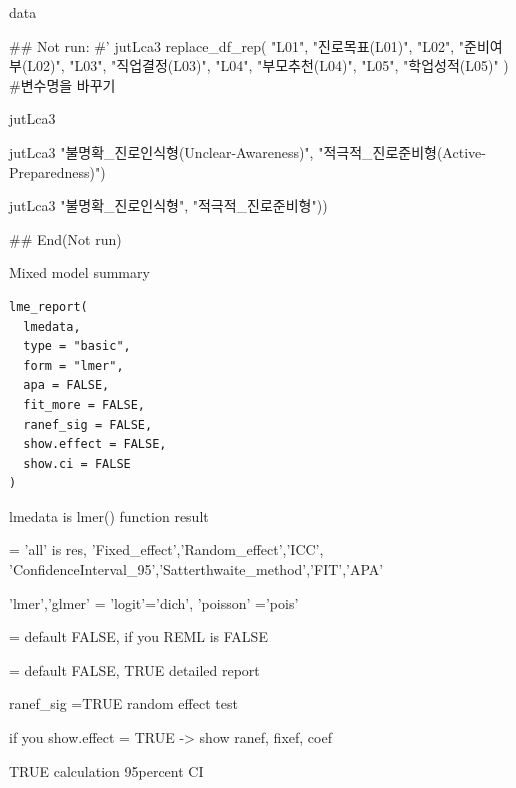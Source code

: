 \documentclass[a4paper]{book}
\begin{document}
%
\begin{Value}
data
\end{Value}
%
\begin{Examples}
\begin{ExampleCode}
\#\# Not run: 
#'
jutLca3 %
  replace_df_rep( "L01", "진로목표(L01)",
                  "L02", "준비여부(L02)",
                  "L03", "직업결정(L03)",
                  "L04", "부모추천(L04)",
                  "L05", "학업성적(L05)" ) #변수명을 바꾸기

jutLca3 %

jutLca3 %
                                   "불명확_진로인식형\n(Unclear-Awareness)",
                                   "적극적_진로준비형\n(Active-Preparedness)")


                      jutLca3 %
                                                         "불명확_진로인식형",
                                                         "적극적_진로준비형"))


## End(Not run)
\end{ExampleCode}
\end{Examples}
%
\begin{Description}
Mixed model summary
\end{Description}
%
\begin{Usage}
\begin{verbatim}
lme_report(
  lmedata,
  type = "basic",
  form = "lmer",
  apa = FALSE,
  fit_more = FALSE,
  ranef_sig = FALSE,
  show.effect = FALSE,
  show.ci = FALSE
)
\end{verbatim}
\end{Usage}
%
\begin{Arguments}
\begin{ldescription}
\item[\code{lmedata}] lmedata is lmer() function result

\item[\code{type}] = 'all' is res, 'Fixed\_effect','Random\_effect','ICC', 'ConfidenceInterval\_95','Satterthwaite\_method','FIT','APA'

\item[\code{form}] 'lmer','glmer' = 'logit'='dich', 'poisson' ='pois'

\item[\code{apa}] = default FALSE, if you  REML is FALSE

\item[\code{fit\_more}] = default FALSE, TRUE detailed report

\item[\code{ranef\_sig}] ranef\_sig =TRUE  random effect test

\item[\code{show.effect}] if you show.effect = TRUE -> show ranef, fixef, coef

\item[\code{show.ci}] TRUE calculation 95percent CI
\end{ldescription}
\end{Arguments}
\end{document}
